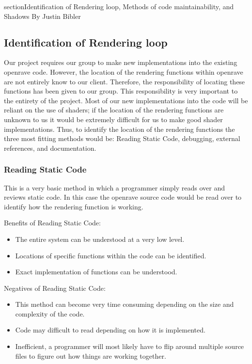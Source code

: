 \documentclass[10pt,journal,compsoc,draftclsnofoot]{IEEEtran}
\begin{document}
\newpage

section{Identification of Rendering loop, Methods of code maintainability, and Shadows}
\large{By Justin Bibler}

\normalsize
\subsection{Identification of Rendering loop}
Our project requires our group to make new implementations into the existing openrave code.
However, the location of the rendering functions within openrave are not entirely know to our client.
Therefore, the responsibility of locating these functions has been given to our group.
This responsibility is very important to the entirety of the project.
Most of our new implementations into the code will be reliant on the use of shaders;
 if the location of the rendering functions are unknown to us it would be extremely difficult for us to make good shader implementations.
Thus, to identify the location of the rendering functions the three most fitting methods would be: Reading Static Code, debugging, external references, and documentation.

\subsubsection{Reading Static Code}
This is a very basic method in which a programmer simply reads over and reviews static code.
In this case the openrave source code would be read over to identify how the rendering function is working.

Benefits of Reading Static Code:
\begin{itemize}
\item The entire system can be understood at a very low level.
\item Locations of specific functions within the code can be identified.
\item Exact implementation of functions can be understood.
\end{itemize}

Negatives of Reading Static Code:
\begin{itemize}
\item This method can become very time consuming depending on the size and complexity of the code.
\item Code may difficult to read depending on how it is implemented.
\item Inefficient, a programmer will most likely have to flip around multiple source files to figure out how things are working together.
\end{itemize}
\end{document}
